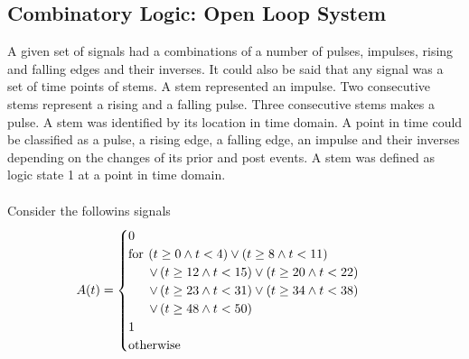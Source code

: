 \documentclass[10pt,journal]{IEEEtran}
\begin{document}
\subsection{Combinatory Logic: Open Loop System}
A given set of signals had a combinations of a number of pulses, impulses,    rising and falling edges and their inverses. It could also be said that any    signal was a set of time points of stems. A stem represented an impulse.    Two consecutive stems represent a rising and a falling pulse. Three    consecutive stems makes a pulse. A stem was identified by its location in    time domain. A point in time could be classified as a pulse, a rising edge,    a falling edge, an impulse and their inverses depending on the changes of its    prior and post events. A stem was defined as logic state 1 at a point    in time domain.\\ \ \\    Consider the followins signals 
\begin{equation}
 \begin{minipage}{250pt}
\begin{flushleft} $\displaystyle A{\left(t \right)} = \begin{cases} 0 & \\  \text{for}\: \left(t \geq 0 \wedge t < 4\right) \vee \left(t \geq 8 \wedge t < 11\right) \\ \quad \ \  \vee \left(t \geq 12 \wedge t < 15\right) \vee \left(t \geq 20 \wedge t < 22\right) \\ \quad \ \  \vee \left(t \geq 23 \wedge t < 31\right) \vee \left(t \geq 34 \wedge t < 38\right) \\ \quad \ \  \vee \left(t \geq 48 \wedge t < 50\right) \\1 & \\  \text{otherwise} \end{cases}$  \end{flushleft}
 \end{minipage}
 \end{equation}
\end{document}
